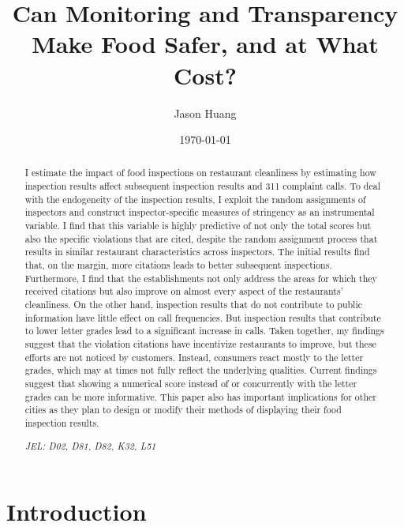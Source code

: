 \documentclass[11pt]{article}
\title{\textbf{Can Monitoring and Transparency Make Food Safer, and at What Cost?}}
\author{Jason Huang}
\date{\bigskip \today}
\begin{document}
\newcommand{\cfbox}[2]{%
    \colorlet{currentcolor}{.}%
    {\color{#1}%
    \fbox{\color{currentcolor}#2}}%
}

\maketitle

\begin{abstract}

I estimate the impact of food inspections on restaurant cleanliness by estimating how inspection results affect subsequent inspection results and 311 complaint calls. To deal with the endogeneity of the inspection results, I exploit the random assignments of inspectors and construct inspector-specific measures of stringency as an instrumental variable. I find that this variable is highly predictive of not only the total scores but also the specific violations that are cited, despite the random assignment process that results in similar restaurant characteristics across inspectors. The initial results find that, on the margin, more citations leads to better subsequent inspections. Furthermore, I find that the establishments not only address the areas for which they received citations but also improve on almost every aspect of the restaurants’ cleanliness. On the other hand, inspection results that do not contribute to public information have little effect on call frequencies. But inspection results that contribute to lower letter grades lead to a significant increase in calls. Taken together, my findings suggest that the violation citations have incentivize restaurants to improve, but these efforts are not noticed by customers. Instead, consumers react mostly to the letter grades, which may at times not fully reflect the underlying qualities. Current findings suggest that showing a numerical score instead of or concurrently with the letter grades can be more informative. This paper also has important implications for other cities as they plan to design or modify their methods of displaying their food inspection results.

\textit{JEL: D02, D81, D82, K32, L51}\\
\end{abstract}
\thispagestyle{empty} \newpage

\onehalfspacing \setcounter{page}{1}

\section{Introduction}
\end{document}
